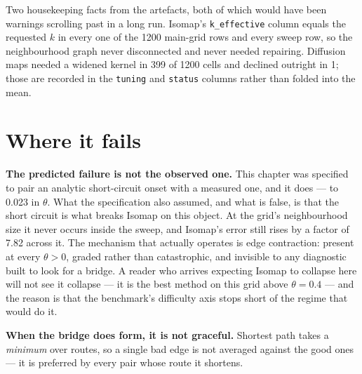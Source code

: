 \documentclass[
  british,
  a4paper,
]{book}
\begin{document}
Two housekeeping facts from the artefacts, both of which would have been
warnings scrolling past in a long run. Isomap's \texttt{k\_effective} column equals the
requested \(k\) in every one of the 1200 main-grid rows
and every sweep row, so the neighbourhood graph never disconnected and never
needed repairing. Diffusion maps needed a widened kernel in
399 of
1200 cells and declined outright in
1; those are recorded in the
\texttt{tuning} and \texttt{status} columns rather than folded into the mean.

\section{Where it fails}\label{geo-limits}

\textbf{The predicted failure is not the observed one.} This chapter was specified to
pair an analytic short-circuit onset with a measured one, and it does --- to
0.023 in \(\theta\). What the
specification also assumed, and what is false, is that the short circuit is what
breaks Isomap on this object. At the grid's neighbourhood size it never occurs
inside the sweep, and Isomap's error still rises by a factor of
7.82 across it. The
mechanism that actually operates is edge contraction: present at every
\(\theta > 0\), graded rather than catastrophic, and invisible to any diagnostic
built to look for a bridge. A reader who arrives expecting Isomap to collapse
here will not see it collapse --- it is the best method on this grid above
\(\theta = 0.4\) --- and the reason is that the benchmark's difficulty
axis stops short of the regime that would do it.

\textbf{When the bridge does form, it is not graceful.} Shortest path takes a \emph{minimum}
over routes, so a single bad edge is not averaged against the good ones --- it is
preferred by every pair whose route it shortens.
\end{document}
